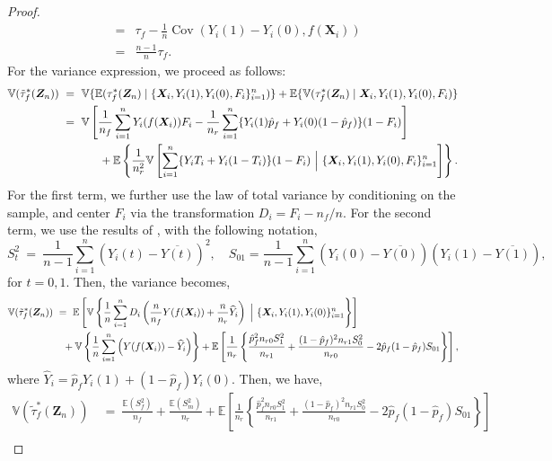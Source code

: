 \documentclass[USenglish,onecolumn]{article}
\DeclareMathOperator\Cov{Cov}
\renewcommand\r{\right}
\renewcommand\l{\left}
\newcommand\E{\mathbb{E}}
\newcommand\V{\mathbb{V}}
\newcommand\bX{\bm{X}}
\newcommand\bZ{\bm{Z}}
\begin{document}
\begin{proof}
\begin{eqnarray*}
    &=&\tau_f-\frac{1}{n}\Cov(Y_i(1)-Y_i(0),f(\bX_i))\\&=&\frac{n-1}{n}\tau_f.
  \end{eqnarray*}
  For the variance expression, we proceed as follows:
  \begin{align*}
    \V(\tilde\tau_f^{*}(\bZ_n)) & \ = \ \V\{\E(\tau_f^{*}(\bZ_n)\mid
                      \{\bX_i, Y_i(1), Y_i(0), F_i\}_{i=1}^n)\}+\E\{\V(\tau_f^{*}(\bZ_n)
                      \mid \bX_i, Y_i(1), Y_i(0), F_i)\}\\
                    & \ = \ \V\l[\frac{1}{n_f} \sum_{i=1}^n
                      Y_i(f(\bX_i))F_i  -
                      \frac{1}{n_r}
                      \sum_{i=1}^n\{Y_i(1)\hat{p}_f+Y_i(0)(1-\hat{p}_f)\}(1-F_i)\r]\\
                    & \hspace{.5in} +\E\l\{\frac{1}{n_r^2}\V\l[\sum_{i=1}^n
                      \{Y_iT_i+Y_i(1-T_i)\}(1-F_i) \ \Bigl  | \ \{\bX_i,
		Y_i(1), Y_i(0), F_i\}_{i=1}^n\r]\r\}.
  \end{align*}
  For the first term, we further use the law of total variance by
  conditioning on the sample, and center $F_i$ via the transformation
  $D_i = F_i - n_f/n$. For the second term, we use the results of
  \cite{neym:23}, with the following notation,
  \begin{equation*}
    S_{t}^2  \ = \  \frac{1}{n-1} \sum_{i=1}^n (Y_i(t)
    -\overline{Y(t)})^2, \quad
    S_{01} = \frac{1}{n-1} \sum_{i=1}^n(Y_i(0) - \overline{Y(0)}) (Y_i(1)
    - \overline{Y(1)}),
  \end{equation*}
  for $t=0,1$.  Then, the variance becomes,
  \begin{align*}
    \V(\tilde\tau_f^{*}(\bZ_n)) & \ = \ \E\l[\V\l\{\frac{1}{n}\sum_{i=1}^n D_i \l(\frac{n}{n_f}
                      Y(f(\bX_i)) +\frac{n}{n_r}
                      \widehat{Y}_i\r) \ \Bigl | \
                      \{\bX_i,Y_i(1),Y_i(0)\}_{i=1}^n \r\}\r] \\
                    & \quad +\V\l\{\frac{1}{n}\sum_{i=1}^n
                      \l(Y(f(\bX_i))-\widehat{Y}_i\r)\r\} +\E\l[\frac{1}{n_r}\l\{\frac{\hat{p}_f^2n_{r0}S_1^2}{n_{r1}}+\frac{(1-\hat{p}_f)^2n_{r1}S_0^2}{n_{r0}}-2\hat{p}_f(1-\hat{p}_f)S_{01}\r\}\r],
  \end{align*}
  where $\widehat{Y}_i=\hat{p}_fY_i(1)+(1-\hat{p}_f)Y_i(0)$.
  Then, we have,
  \begin{align*}
    \V(\tilde\tau_f^{*}(\bZ_n)) & \ = \
		\frac{\E(S_f^2)}{n_f}+\frac{\E(S_m^2)}{n_r}+\E\l[\frac{1}{n_r}\l\{\frac{\hat{p}_f^2n_{r0}S_1^2}{n_{r1}}+\frac{(1-\hat{p}_f)^2n_{r1}S_0^2}{n_{r0}}-2\hat{p}_f(1-\hat{p}_f)S_{01}\r\}\r]\\

\end{align*}
\end{proof}
\end{document}
